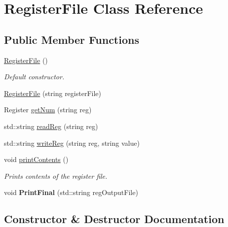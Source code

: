 \hypertarget{class_register_file}{}\section{Register\+File Class Reference}
\label{class_register_file}
\subsection*{Public Member Functions}
\begin{DoxyCompactItemize}
\item 
\mbox{\hyperlink{class_register_file_a9513989ee395d14943de66f99ec8014a}{Register\+File}} ()
\begin{DoxyCompactList}\small\item\em Default constructor. \end{DoxyCompactList}\item 
\mbox{\hyperlink{class_register_file_a9085db6aaabf8e55819d8bbd73f521b4}{Register\+File}} (string register\+File)
\item 
Register \mbox{\hyperlink{class_register_file_a54d87ad82368cfa1dfb8b3f01a3d2e5a}{get\+Num}} (string reg)
\item 
std\+::string \mbox{\hyperlink{class_register_file_a5554dd7d1b78c4a59b23036e9aa66136}{read\+Reg}} (string reg)
\item 
std\+::string \mbox{\hyperlink{class_register_file_a4e4802bee78d7c7173c829764babca9c}{write\+Reg}} (string reg, string value)
\item 
void \mbox{\hyperlink{class_register_file_ac72ef70e7bdee7b5ac7afbfdcd6d8ab1}{print\+Contents}} ()
\begin{DoxyCompactList}\small\item\em Prints contents of the register file. \end{DoxyCompactList}\item 
\mbox{\label{class_register_file_a5984466485aece8fff70e240903beb35}} 
void {\bfseries Print\+Final} (std\+::string reg\+Output\+File)
\end{DoxyCompactItemize}


\subsection{Constructor \& Destructor Documentation}
\mbox{\label{class_register_file_a9513989ee395d14943de66f99ec8014a}} 
